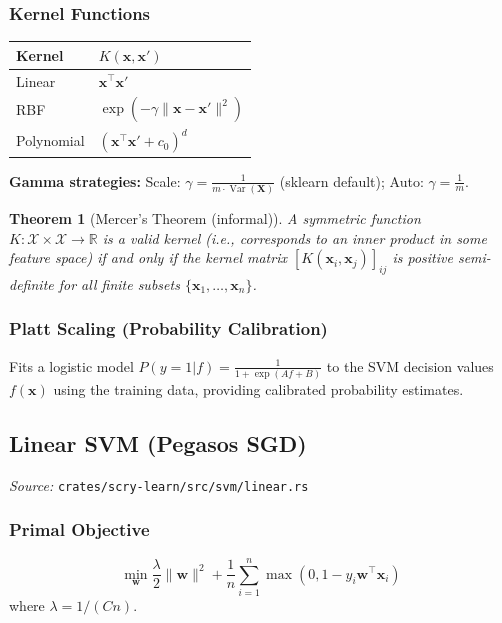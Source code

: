 \documentclass[11pt,a4paper]{article}
\newtheorem{theorem}{Theorem}[section]
\theoremstyle{definition}
\theoremstyle{remark}
\DeclareMathOperator{\Var}{Var}
\begin{document}
\subsubsection*{Kernel Functions}

\begin{center}
\begin{tabular}{ll}
\toprule
Kernel & $K(\mathbf{x}, \mathbf{x}')$ \\
\midrule
Linear & $\mathbf{x}^\top\mathbf{x}'$ \\
RBF & $\exp(-\gamma\|\mathbf{x} - \mathbf{x}'\|^2)$ \\
Polynomial & $(\mathbf{x}^\top\mathbf{x}' + c_0)^d$ \\
\bottomrule
\end{tabular}
\end{center}

\textbf{Gamma strategies:} Scale: $\gamma = \frac{1}{m \cdot \Var(\mathbf{X})}$ (sklearn default); Auto: $\gamma = \frac{1}{m}$.

\begin{theorem}[Mercer's Theorem (informal)]
A symmetric function $K: \mathcal{X} \times \mathcal{X} \to \mathbb{R}$ is a valid kernel (i.e., corresponds to an inner product in some feature space) if and only if the kernel matrix $[K(\mathbf{x}_i, \mathbf{x}_j)]_{ij}$ is positive semi-definite for all finite subsets $\{\mathbf{x}_1, \ldots, \mathbf{x}_n\}$.
\end{theorem}

\subsubsection*{Platt Scaling (Probability Calibration)}

Fits a logistic model $P(y=1|f) = \frac{1}{1+\exp(Af+B)}$ to the SVM decision values $f(\mathbf{x})$ using the training data, providing calibrated probability estimates.

\subsection{Linear SVM (Pegasos SGD)}
\label{sec:lsvm}

\noindent\textit{Source:} \texttt{crates/scry-learn/src/svm/linear.rs}

\subsubsection*{Primal Objective}
\begin{equation}
\min_\mathbf{w} \frac{\lambda}{2}\|\mathbf{w}\|^2 + \frac{1}{n}\sum_{i=1}^n \max(0, 1 - y_i\mathbf{w}^\top\mathbf{x}_i)
\end{equation}
where $\lambda = 1/(Cn)$.
\end{document}
